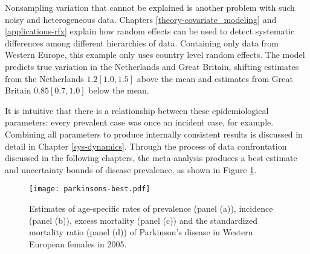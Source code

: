Nonsampling variation that cannot be explained is another problem with
such noisy and heterogeneous data.  Chapters
\ref{theory-covariate_modeling} and \ref{applications-rfx} explain how
random effects can be used to detect systematic differences among
different hierarchies of data.  Containing only data from Western Europe,
this example only uses country level random effects.  The model predicts 
true variation in the Netherlands and Great Britain, shifting estimates 
from the Netherlands $1.2 [1.0, 1.5]$ above the mean and estimates
from Great Britain $0.85 [0.7, 1.0]$ below the mean.

It is intuitive that there is a relationship between these
epidemiological parameters: every prevalent case was once an incident
case, for example.  Combining all parameters to produce internally
consistent results is discussed in detail in Chapter
\ref{sys-dynamics}.  Through the process of data confrontation
discussed in the following chapters, the meta-analysis produces a best
estimate and uncertainty bounds of disease prevalence, as shown in
Figure \ref{fig:intro-parkinsons fit}.

    \begin{figure}[h]
        \begin{center}
            \texttt{[image: parkinsons-best.pdf]}
            \caption{Estimates of age-specific rates of
              prevalence (panel (a)), incidence (panel (b)),
              excess mortality (panel (c)) and the
              standardized mortality ratio (panel (d)) of Parkinson's
              disease in Western European females in 2005.}
            \label{fig:intro-parkinsons fit}
        \end{center}
    \end{figure}
